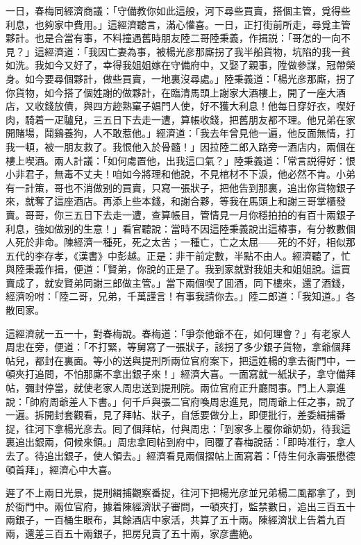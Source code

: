 一日，春梅同經濟商議：「守備教你如此這般，河下尋些買賣，搭個主管，覓得些利息，也夠家中費用。」這經濟聽言，滿心懽喜。一日，正打街前所走，尋覓主管夥計。也是合當有事，不料撞遇舊時朋友陸二哥陸秉義，作揖説：「哥怎的一向不見？」這經濟道：「我因亡妻為事，被楊光彦那廝拐了我半船貨物，坑陷的我一貧如洗。我如今又好了，幸得我姐姐嫁在守備府中，又娶了親事，陞做參謀，冠帶榮身。如今要尋個夥計，做些買賣，一地裏沒尋處。」陸秉義道：「楊光彦那廝，拐了你貨物，如今搭了個姓謝的做夥計，在臨清馬頭上謝家大酒樓上，開了一座大酒店，又收錢放債，與四方趂熟窠子娼門人使，好不獲大利息！他每日穿好衣，喫好肉，騎着一疋驢兒，三五日下去走一遭，算帳收錢，把舊朋友都不理。他兄弟在家開賭場，鬦鷄養狗，人不敢惹他。」經濟道：「我去年曾見他一遍，他反面無情，打我一頓，被一朋友救了。我恨他入於骨髓！」因拉陸二郎入路旁一酒店内，兩個在樓上喫酒。兩人計議：「如何䖏置他，出我這口氣？」陸秉義道：「常言説得好：恨小非君子，無毒不丈夫！咱如今將理和他說，不見棺材不下淚，他必然不肯。小弟有一計策，哥也不消做别的買賣，只寫一張狀子，把他告到那裏，追出你貨物銀子來，就奪了這座酒店。再添上些本錢，和謝合夥，等我在馬頭上和謝三哥掌櫃發賣。哥哥，你三五日下去走一遭，查算帳目，管情見一月你穩拍拍的有百十兩銀子利息，強如做别的生意！」看官聽說：當時不因這陸秉義說出這樁事，有分教數個人死於非命。陳經濟一種死，死之太苦；一種亡，亡之太屈——死的不好，相似那五代的李存孝，《漢書》中彭越。正是：非干前定數，半點不由人。經濟聽了，忙與陸秉義作揖，便道：「賢弟，你說的正是了。我到家就對我姐夫和姐姐說。這買賣成了，就安賢弟同謝三郎做主管。」當下兩個喫了囬酒，同下樓來，還了酒錢，經濟吩咐：「陸二哥，兄弟，千萬謹言！有事我請你去。」陸二郎道：「我知道。」各散囘家。

這經濟就一五一十，對春梅說。春梅道：「爭奈他爺不在，如何理會？」有老家人周忠在旁，便道：「不打緊，等舅寫了一張狀子，該拐了多少銀子貨物，拿爺個拜帖兒，都封在裏面。等小的送與提刑所兩位官府案下，把這姓楊的拿去衙門中，一頓夾打追問，不怕那廝不拿出銀子來！」經濟大喜。一面寫就一紙狀子，拿守備拜帖，彌封停當，就使老家人周忠送到提刑院。兩位官府正升廳問事。門上人禀進說：「帥府周爺差人下書。」何千戶與張二官府喚周忠進見，問周爺上任之事，說了一遍。拆開封套觀看，見了拜帖、狀子，自恁要做分上，即便批行，差委緝捕番捉，往河下拿楊光彦去。囘了個拜帖，付與周忠：「到家多上覆你爺奶奶，待我這裏追出銀兩，伺候來領。」周忠拿囘帖到府中，囘覆了春梅說話：「即時准行，拿人去了。待追出銀子，使人領去。」經濟看見兩個摺帖上面寫着：「侍生何永壽張懋德頓首拜」，經濟心中大喜。

遲了不上兩日光景，提刑緝捕觀察番捉，往河下把楊光彦並兄弟楊二風都拿了，到於衙門中。兩位官府，據着陳經濟狀子審問，一頓夾打，監禁數日，追出三百五十兩銀子，一百桶生眼布，其餘酒店中家活，共算了五十兩。陳經濟狀上告着九百兩，還差三百五十兩銀子，把房兒賣了五十兩，家彦盡絶。

